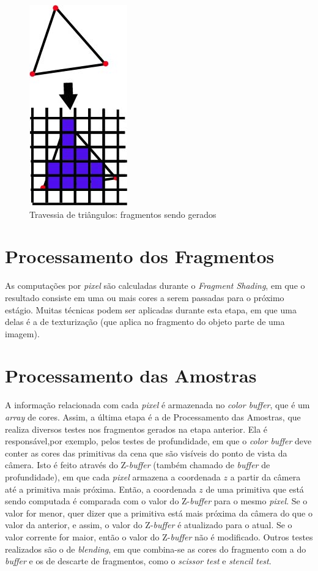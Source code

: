 \begin{anexosenv}
  \begin{figure}[ht]
       \centering
	\includegraphics[keepaspectratio=true,scale=0.8]{figuras/traversal.jpg}
       \caption{Travessia de triângulos: fragmentos sendo gerados}
       \label{traversal}
       \end{figure}

\section{Processamento dos Fragmentos}

	As computações por \textit{pixel} são calculadas durante o \textit{Fragment Shading}, em que o resultado consiste em uma ou mais cores a serem passadas para o próximo estágio. Muitas técnicas podem ser aplicadas durante esta etapa, em que uma delas é a de texturização (que aplica no fragmento do objeto parte de uma imagem). 

\section{Processamento das Amostras}

	 A informação relacionada com cada \textit{pixel} é armazenada no \textit{color buffer}, que é um \textit{array} de cores. Assim, a última etapa é a de Processamento das Amostras, que realiza diversos testes nos fragmentos gerados na etapa anterior. Ela é responsável,por exemplo, pelos testes de profundidade, em que o \textit{color buffer} deve conter as cores das primitivas da cena que são visíveis do ponto de vista da câmera. Isto é feito através do Z-\textit{buffer} (também chamado de \textit{buffer} de profundidade), em que cada \textit{pixel} armazena a coordenada $z$ a partir da câmera até a primitiva mais próxima.  Então, a coordenada $z$ de uma primitiva que está sendo computada é comparada com  o valor do Z-\textit{buffer} para o mesmo \textit{pixel}. Se o valor for menor, quer dizer que a primitiva está mais próxima da câmera do que o valor da anterior, e assim, o valor do Z-\textit{buffer} é atualizado para o atual. Se o valor corrente for maior, então o valor do Z-\textit{buffer} não é modificado. Outros testes realizados são o de \textit{blending}, em que combina-se as cores do fragmento com a do \textit{buffer} e os de descarte de fragmentos, como o \textit{scissor test} e \textit{stencil test}. 	


\end{anexosenv}
